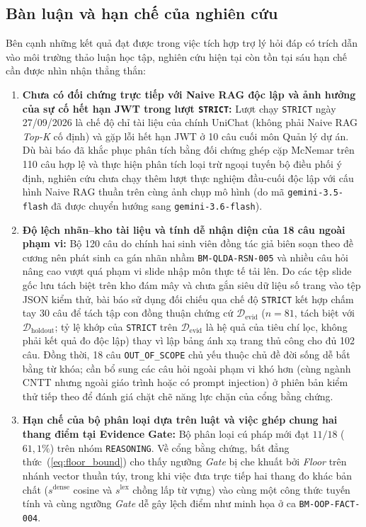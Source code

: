 \documentclass{IEEEtran}
\begin{document}
\subsection{Bàn luận và hạn chế của nghiên cứu}
\label{subsec:discussion_limitations}
Bên cạnh những kết quả đạt được trong việc tích hợp trợ lý hỏi đáp có trích dẫn vào môi trường thảo luận học tập, nghiên cứu hiện tại còn tồn tại sáu hạn chế cần được nhìn nhận thẳng thắn:
\begin{enumerate}
    \item \textbf{Chưa có đối chứng trực tiếp với Naive RAG độc lập và ảnh hưởng của sự cố hết hạn JWT trong lượt \texttt{STRICT}:} Lượt chạy \texttt{STRICT} ngày 27/09/2026 là chế độ chỉ tài liệu của chính UniChat (không phải Naive RAG \textit{Top-K} cố định) và gặp lỗi hết hạn JWT ở 10 câu cuối môn Quản lý dự án. Dù bài báo đã khắc phục phân tích bằng đối chứng ghép cặp McNemar trên 110 câu hợp lệ và thực hiện phân tích loại trừ ngoại tuyến bộ điều phối ý định, nghiên cứu chưa chạy thêm lượt thực nghiệm đầu-cuối độc lập với cấu hình Naive RAG thuần trên cùng ảnh chụp mô hình (do mã \texttt{gemini-3.5-flash} đã được chuyển hướng sang \texttt{gemini-3.6-flash}).
    \item \textbf{Độ lệch nhãn--kho tài liệu và tính dễ nhận diện của 18 câu ngoài phạm vi:} Bộ 120 câu do chính hai sinh viên đồng tác giả biên soạn theo đề cương nên phát sinh ca gán nhãn nhầm \texttt{BM-QLDA-RSN-005} và nhiều câu hỏi nâng cao vượt quá phạm vi slide nhập môn thực tế tải lên. Do các tệp slide gốc lưu tách biệt trên kho đám mây và chưa gắn siêu dữ liệu số trang vào tệp JSON kiểm thử, bài báo sử dụng đối chiếu qua chế độ \texttt{STRICT} kết hợp chấm tay 30 câu để tách tập con đồng thuận chứng cứ $\mathcal{D}_{\text{evid}}$ ($n=81$, tách biệt với $\mathcal{D}_{\text{holdout}}$; tỷ lệ khớp của \texttt{STRICT} trên $\mathcal{D}_{\text{evid}}$ là hệ quả của tiêu chí lọc, không phải kết quả đo độc lập) thay vì lập bảng ánh xạ trang thủ công cho đủ 102 câu. Đồng thời, 18 câu \texttt{OUT\_OF\_SCOPE} chủ yếu thuộc chủ đề đời sống dễ bắt bằng từ khóa; cần bổ sung các câu hỏi ngoài phạm vi khó hơn (cùng ngành CNTT nhưng ngoài giáo trình hoặc có prompt injection) ở phiên bản kiểm thử tiếp theo để đánh giá chặt chẽ năng lực chặn của cổng bằng chứng.
    \item \textbf{Hạn chế của bộ phân loại dựa trên luật và việc ghép chung hai thang điểm tại Evidence Gate:} Bộ phân loại cú pháp mới đạt $11/18$ ($61{,}1\%$) trên nhóm \texttt{REASONING}. Về cổng bằng chứng, bất đẳng thức~(\ref{eq:floor_bound}) cho thấy ngưỡng \textit{Gate} bị che khuất bởi \textit{Floor} trên nhánh vector thuần túy, trong khi việc đưa trực tiếp hai thang đo khác bản chất ($s^{\text{dense}}$ cosine và $s^{\text{lex}}$ chồng lấp từ vựng) vào cùng một công thức tuyến tính và cùng ngưỡng \textit{Gate} dễ gây lệch điểm như minh họa ở ca \texttt{BM-OOP-FACT-004}.

\end{enumerate}
\end{document}
